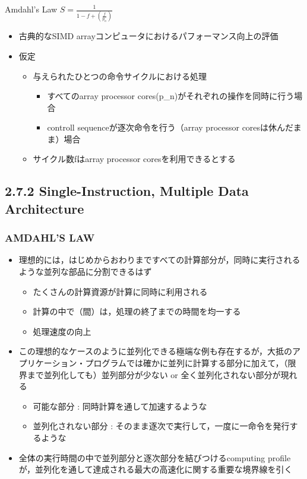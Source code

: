 \documentclass[12pt, unicode, dvipdfmx, t]{beamer}
\begin{document}
\begin{frame}[t]
	\begin{alertblock}{Amdahl's Law}
		\centering
		$S = \frac{1}{1-f+\left(\frac{f}{p_n}\right)}$
	\end{alertblock}

	\begin{itemize}
		\item 古典的なSIMD arrayコンピュータにおけるパフォーマンス向上の評価
		\item 仮定
		\begin{itemize}
			\item 与えられたひとつの命令サイクルにおける処理
			\begin{itemize}
				\item すべてのarray processor cores(p\_n)がそれぞれの操作を同時に行う場合
				\item controll sequenceが逐次命令を行う（array processor coresは休んだまま）場合
			\end{itemize}
			\item サイクル数fはarray processor coresを利用できるとする
		\end{itemize}
	\end{itemize}
\end{frame}

\subsection{2.7.2 Single-Instruction, Multiple Data Architecture}
\begin{frame}[t]
	\frametitle{AMDAHL'S LAW}
	\begin{itemize}
		\item 理想的には，はじめからおわりまですべての計算部分が，同時に実行されるような並列な部品に分割できるはず
		\begin{itemize}
			\item たくさんの計算資源が計算に同時に利用される
			\item 計算の中で（間）は，処理の終了までの時間を均一する
			\item 処理速度の向上
		\end{itemize}
		\item この理想的なケースのように並列化できる極端な例も存在するが，大抵のアプリケーション・プログラムでは確かに並列に計算する部分に加えて，（限界まで並列化しても）並列部分が少ない or 全く並列化されない部分が現れる
		\begin{itemize}
			\item 可能な部分 : 同時計算を通して加速するような
			\item 並列化されない部分 : そのまま逐次で実行して，一度に一命令を発行するような
		\end{itemize}
	\item 全体の実行時間の中で並列部分と逐次部分を結びつける\alert{computing profile}が，並列化を通して達成される最大の高速化に関する重要な境界線を引く
	\end{itemize}
\end{frame}
\end{document}
